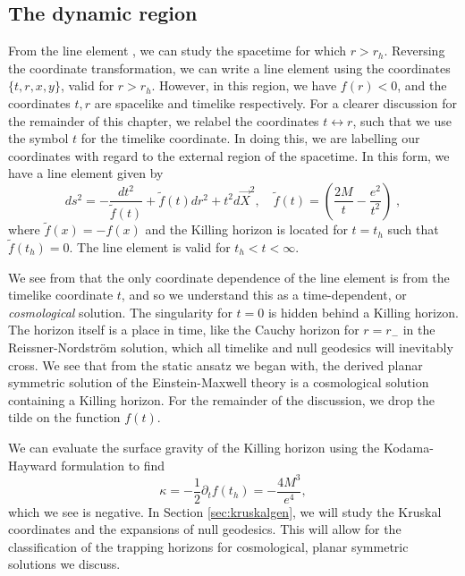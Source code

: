 \subsection{The dynamic region}
\label{sec:dynamicem}

From the line element , we can study the spacetime for which $r > r_h$. Reversing the coordinate transformation, we can write a line element using the coordinates $\{t,r,x,y\}$, valid for $r > r_h$. However, in this region, we have $f(r) < 0$, and the coordinates $t,r$ are spacelike and timelike respectively. For a clearer discussion for the remainder of this chapter, we relabel the coordinates $t \leftrightarrow r$, such that we use the symbol $t$ for the timelike coordinate. In doing this, we are labelling our coordinates with regard to the external region of the spacetime. In this form, we have a line element given by
\begin{equation}
\label{eq:Region_II}
	ds^2 = - \frac{dt^2}{\tilde{f}(t)} + \tilde{f}(t) dr^2 + t^2 d\vec{X}^2, \quad \tilde{f}(t) = \left( \frac{2M}{t} - \frac{e^2}{t^2} \right) \; ,
\end{equation}
where $\tilde{f}(x) = -f(x)$ and the Killing horizon is located for $t = t_h$ such that $\tilde{f}(t_h) = 0$. The line element is valid for $t_h < t < \infty$. 

We see from  that the only coordinate dependence of the line element is from the timelike coordinate $t$, and so we understand this as a time-dependent, or \emph{cosmological} solution. The singularity for $t = 0$ is hidden behind a Killing horizon. The horizon itself is a place in time, like the Cauchy horizon for $r = r_-$ in the Reissner-Nordstr\"om solution, which all timelike and null geodesics will inevitably cross. We see that from the static ansatz we began with, the derived planar symmetric solution of the Einstein-Maxwell theory is a cosmological solution containing a Killing horizon. For the remainder of the discussion, we drop the tilde on the function $f(t)$.

We can evaluate the surface gravity of the Killing horizon using the Kodama-Hayward formulation  to find
\begin{equation}
\label{eq:pemsurfacegravity}
	\kappa = -\frac{1}{2} \partial_t f(t_h) = -\frac{4M^3}{e^4},
\end{equation}
which we see is negative. In Section \ref{sec:kruskalgen}, we will study the Kruskal coordinates and the expansions of null geodesics. This will allow for the classification of the trapping horizons for cosmological, planar symmetric solutions we discuss.

